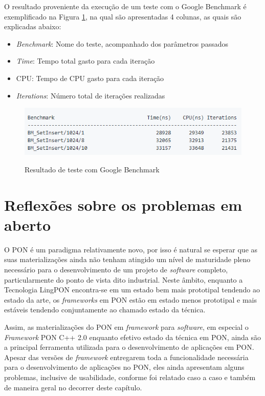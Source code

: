 O resultado proveniente da execução de um teste com o Google Benchmark é
exemplificado na Figura \ref{fig:google_bench_result}, na qual são apresentadas
4 colunas, as quais são explicadas abaixo:

\begin{itemize}
  \item \textit{Benchmark}: Nome do teste, acompanhado dos parâmetros passados
  \item \textit{Time}: Tempo total gasto para cada iteração
  \item CPU: Tempo de CPU gasto para cada iteração
  \item \textit{Iterations}: Número total de iterações realizadas
\end{itemize}

\begin{figure}[!htb]
  \centering
  \caption{Resultado de teste com Google Benchmark}
  \includegraphics[width=.8\textwidth]{../figures/google_bench_result.png}
  \label{fig:google_bench_result}
\end{figure}

\section{Reflexões sobre os problemas em aberto}\label{sec:problemas}

O PON é um paradigma relativamente novo, por isso é natural se esperar que as
suas materializações ainda não tenham atingido um nível de maturidade pleno
necessário para o desenvolvimento de um projeto de \textit{software} completo,
particularmente do ponto de vista dito industrial. Neste âmbito, enquanto a
Tecnologia LingPON encontra-se em um estado bem mais prototipal tendendo ao
estado da arte, os \textit{frameworks} em PON estão em estado menos prototipal e
mais estáveis tendendo conjuntamente ao chamado estado da técnica. 

Assim, as materializações do PON em \textit{framework} para \textit{software},
em especial o \textit{Framework} PON C++ 2.0 enquanto efetivo estado da técnica
em PON, ainda são a principal ferramenta utilizada para o desenvolvimento de
aplicações em PON. Apesar das versões de \textit{framework} entregarem toda a
funcionalidade necessária para o desenvolvimento de aplicações no PON, eles
ainda apresentam alguns problemas, inclusive de usabilidade, conforme foi
relatado caso a caso e também de maneira geral no decorrer deste capítulo.

